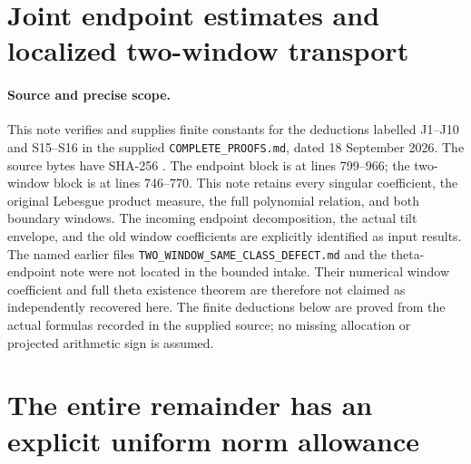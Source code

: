 \endgroup

\clearpage
\begingroup
\def\C{\mathbb C}
\def\R{\mathbb R}
\def\Pcal{\mathcal P}
\def\norm#1{\left\lVert#1\right\rVert}
\def\abs#1{\left|#1\right|}

\setcounter{equation}{0}
\renewcommand{\theequation}{JW.\arabic{equation}}
\section*{Joint endpoint estimates and localized two-window transport}



\paragraph{Source and precise scope.}
This note verifies and supplies finite constants for the deductions labelled
J1--J10 and S15--S16 in the supplied \texttt{COMPLETE\_PROOFS.md}, dated
18 September 2026.  The source bytes have SHA-256
.
The endpoint block is at lines 799--966; the two-window block is at
lines 746--770.  This note retains every singular coefficient, the original
Lebesgue product measure, the full polynomial relation, and both boundary
windows.  The incoming endpoint decomposition, the actual tilt envelope,
and the old window coefficients are explicitly identified as input results.
The named earlier files \texttt{TWO\_WINDOW\_SAME\_CLASS\_DEFECT.md} and the
theta-endpoint note were not located in the bounded intake.  Their numerical
window coefficient and full theta existence theorem are therefore not
claimed as independently recovered here.  The finite deductions below are
proved from the actual formulas recorded in the supplied source; no missing
allocation or projected arithmetic sign is assumed.

\section{The entire remainder has an explicit uniform norm allowance}

